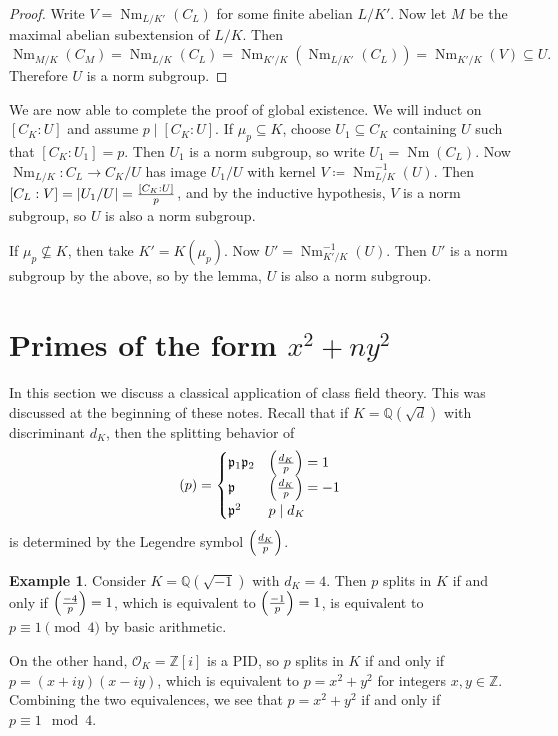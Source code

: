 \documentclass[leqno, openany]{memoir}
\theoremstyle{definition}
\newtheorem{exm}[thm]{Example}
\theoremstyle{remark}
\theoremstyle{plain}
\theoremstyle{definition}
\theoremstyle{remark}
\newcommand{\Z}{\mathbb{Z}}
\newcommand{\Q}{\mathbb{Q}}
\newcommand{\mc}[1]{\mathcal{#1}}
\newcommand{\mf}[1]{\mathfrak{#1}}
\DeclareMathOperator{\Nm}{Nm}
\begin{document}
\begin{proof}
    Write $V = \Nm_{L/K'}(C_L)$ for some finite abelian $L/K'$. Now let $M$ be the maximal abelian subextension of $L/K$. Then
    \[ \Nm_{M/K}(C_M) = \Nm_{L/K}(C_L) = \Nm_{K'/K} (\Nm_{L/K'}(C_L)) = \Nm_{K'/K}(V) \subseteq U. \]
    Therefore $U$ is a norm subgroup.
\end{proof}

We are now able to complete the proof of global existence. We will induct on $[C_K : U]$ and assume $p \mid [C_K : U]$. If $\mu_p \subseteq K$, choose $U_1 \subseteq C_K$ containing $U$ such that $[C_K : U_1] = p$. Then $U_1$ is a norm subgroup, so write $U_1 = \Nm(C_L)$. Now $\Nm_{L/K} \colon C_L \to C_K / U$ has image $U_1 / U$ with kernel $V \coloneqq \Nm_{L/K}^{-1}(U)$. Then $[C_L:V] = \abs{U_1/U} = \frac{[C_K:U]}{p}$, and by the inductive hypothesis, $V$ is a norm subgroup, so $U$ is also a norm subgroup.

If $\mu_p \not\subseteq K$, then take $K' = K(\mu_p)$. Now $U' = \Nm_{K'/K}^{-1}(U)$. Then $U'$ is a norm subgroup by the above, so by the lemma, $U$ is also a norm subgroup.

\section{Primes of the form $x^2 + ny^2$}%
\label{sec:primes_of_the_form_x_2_ny_2_}

In this section we discuss a classical application of class field theory. This was discussed at the beginning of these notes. Recall that if $K = \Q(\sqrt{d})$ with discriminant $d_K$, then the splitting behavior of
\[ (p) = \begin{cases}
    \mf{p}_1 \mf{p}_2 & \qty(\frac{d_K}{p}) = 1 \\
    \mf{p} & \qty(\frac{d_K}{p}) = -1 \\
    \mf{p}^2 & p \mid d_K
\end{cases} \]
is determined by the Legendre symbol $\qty(\frac{d_K}{p})$.

\begin{exm}
    Consider $K = \Q(\sqrt{-1})$ with $d_K = 4$. Then $p$ splits in $K$ if and only if $\qty(\frac{-4}{p}) = 1$, which is equivalent to $\qty(\frac{-1}{p}) = 1$, is equivalent to $p \equiv 1 \pmod 4$ by basic arithmetic.

    On the other hand, $\mc{O}_K = \Z[i]$ is a PID, so $p$ splits in $K$ if and only if $p = (x+iy)(x-iy)$, which is equivalent to $p = x^2 + y^2$ for integers $x,y \in \Z$. Combining the two equivalences, we see that $p = x^2 + y^2$ if and only if $p \equiv 1 \mod 4$.
\end{exm}
\end{document}
